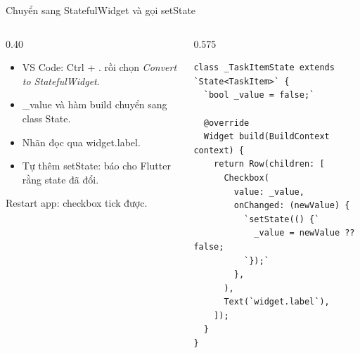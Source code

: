 \documentclass[aspectratio=169,11pt]{beamer}
\newcommand{\ma}[1]{{\ttfamily\small #1}}
\newcommand{\chot}[1]{%
  \par\vspace{2.5mm}%
  \colorbox{nenhop}{\parbox{\dimexpr\linewidth-2\fboxsep\relax}{\raggedright\small\color{chinh}#1}}}
\begin{document}
\begin{frame}[fragile]{Chuyển sang StatefulWidget và gọi setState}
  \begin{columns}[T,onlytextwidth]
    \begin{column}{0.40\textwidth}
      \begin{itemize}
        \item VS Code: \ma{Ctrl + .} rồi chọn \emph{Convert to StatefulWidget}.
        \item \ma{\_value} và hàm \ma{build} chuyển sang class State.
        \item Nhãn đọc qua \ma{widget.label}.
        \item Tự thêm \ma{setState}: báo cho Flutter rằng state đã đổi.
      \end{itemize}
      \chot{Restart app: checkbox tick được.}
    \end{column}
    \begin{column}{0.575\textwidth}
\begin{lstlisting}
class _TaskItemState extends `State<TaskItem>` {
  `bool _value = false;`

  @override
  Widget build(BuildContext context) {
    return Row(children: [
      Checkbox(
        value: _value,
        onChanged: (newValue) {
          `setState(() {`
            _value = newValue ?? false;
          `});`
        },
      ),
      Text(`widget.label`),
    ]);
  }
}
\end{lstlisting}
    \end{column}
  \end{columns}
\end{frame}

\end{document}
